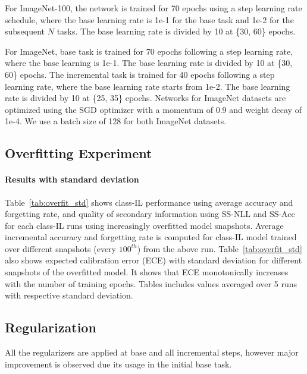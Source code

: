 \documentclass[final]{cvpr}
\begin{document}
For ImageNet-100, the network is trained for 70 epochs using a step learning rate schedule, where the base learning rate is 1e-1 for the base task and 1e-2 for the subsequent $N$ tasks. The base learning rate is divided by 10 at \{30, 60\} epochs. 

For ImageNet, base task is trained for 70 epochs following a step learning rate, where the base learning is 1e-1. The base learning rate is divided by 10 at \{30, 60\} epochs.
The incremental task is trained for 40 epochs following a step learning rate, where the base learning rate starts from 1e-2. The base learning rate is divided by 10 at \{25, 35\} epochs. 
Networks for ImageNet datasets are optimized using the SGD optimizer with a momentum of 0.9 and weight decay of 1e-4. We use a batch size of 128 for both ImageNet datasets.











\subsection{Overfitting Experiment}

\paragraph{Results with standard deviation} Table~\ref{tab:overfit_std} shows class-IL performance using average accuracy and forgetting rate, and quality of secondary information using SS-NLL and SS-Acc for each class-IL runs using increasingly overfitted model snapshots. Average incremental accuracy and forgetting rate is computed for class-IL model trained over different snapshots (every $100^{th}$) from the above run. Table~\ref{tab:overfit_std} also shows expected calibration error (ECE) with standard deviation for different snapshots of the overfitted model. It shows that ECE monotonically increases with the number of training epochs.
Tables includes values averaged over 5 runs with respective standard deviation.











\subsection{Regularization}
\label{app:regularization}
All the regularizers are applied at base and all incremental steps, however major improvement is observed due its usage in the initial base task. 
\end{document}
